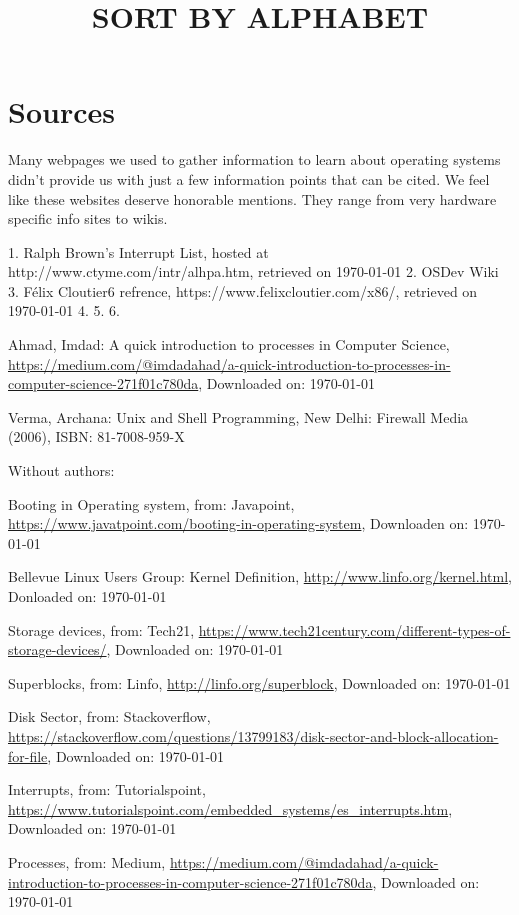 \section{Sources}

Many webpages we used to gather information to learn about operating systems didn't provide us with
just a few information points that can be cited. We feel like these websites deserve honorable
mentions. They range from very hardware specific info sites to wikis.

\title{SORT BY ALPHABET}

1. Ralph Brown's Interrupt List, hosted at http://www.ctyme.com/intr/alhpa.htm, retrieved on \today
2. OSDev Wiki
3. Félix Cloutier6 refrence, https://www.felixcloutier.com/x86/, retrieved on \today
4. 
5.
6.

\begin{thebibliography}{10}

	Ahmad, Imdad: A quick introduction to processes in Computer Science,
	\url{https://medium.com/@imdadahad/a-quick-introduction-to-processes-in-computer-science-271f01c780da},
	Downloaded on: \today

	Verma, Archana: Unix and Shell Programming,
	New Delhi: Firewall Media (2006),
	ISBN: 81-7008-959-X



Without authors:

	Booting in Operating system, from: Javapoint,
	\url{https://www.javatpoint.com/booting-in-operating-system},
	Downloaden on: \today

	Bellevue Linux Users Group: Kernel Definition,
	\url{http://www.linfo.org/kernel.html},
	Donloaded on: \today

	Storage devices, from: Tech21,
	\url{https://www.tech21century.com/different-types-of-storage-devices/},
	Downloaded on: \today

	Superblocks, from: Linfo,
	\url{http://linfo.org/superblock},
	Downloaded on: \today

	Disk Sector, from: Stackoverflow,
	\url{https://stackoverflow.com/questions/13799183/disk-sector-and-block-allocation-for-file},
	Downloaded on: \today

	Interrupts, from: Tutorialspoint,
	\url{https://www.tutorialspoint.com/embedded_systems/es_interrupts.htm},
	Downloaded on: \today

	Processes, from: Medium,
	\url{https://medium.com/@imdadahad/a-quick-introduction-to-processes-in-computer-science-271f01c780da},
	Downloaded on: \today


\end{thebibliography}
